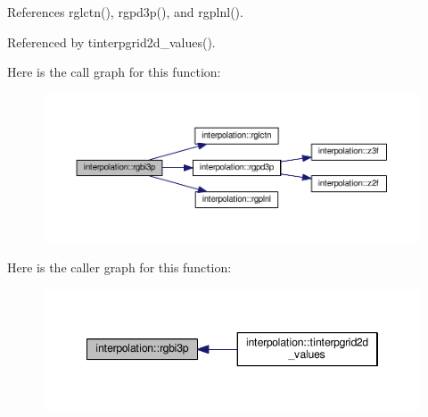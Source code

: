 References rglctn(), rgpd3p(), and rgplnl().



Referenced by tinterpgrid2d\+\_\+values().

Here is the call graph for this function\+:
\nopagebreak
\begin{figure}[H]
\begin{center}
\leavevmode
\includegraphics[width=350pt]{namespaceinterpolation_a44b1a5e85b19c58f04e2f7e3483cbb3f_cgraph}
\end{center}
\end{figure}
Here is the caller graph for this function\+:
\nopagebreak
\begin{figure}[H]
\begin{center}
\leavevmode
\includegraphics[width=346pt]{namespaceinterpolation_a44b1a5e85b19c58f04e2f7e3483cbb3f_icgraph}
\end{center}
\end{figure}
\mbox{\label{namespaceinterpolation_a2ddceaba83710295f2263bfbe4aa6924}} 
